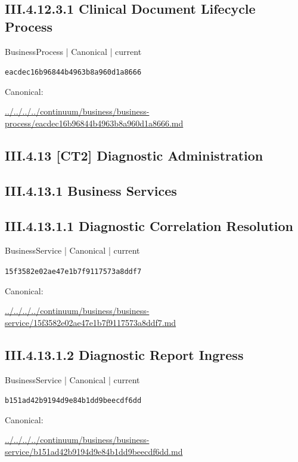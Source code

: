 \documentclass[10pt,a4paper]{article}
\begin{document}
\subsection*{III.4.12.3.1 Clinical Document Lifecycle Process}
{\small BusinessProcess | Canonical | current}\par
\texttt{eacdec16b96844b4963b8a960d1a8666}\par
Canonical: \par
{\footnotesize\url{../../../../continuum/business/business-process/eacdec16b96844b4963b8a960d1a8666.md}}\par
\subsection*{III.4.13 [CT2] Diagnostic Administration}
\subsection*{III.4.13.1 Business Services}
\subsection*{III.4.13.1.1 Diagnostic Correlation Resolution}
{\small BusinessService | Canonical | current}\par
\texttt{15f3582e02ae47e1b7f9117573a8ddf7}\par
Canonical: \par
{\footnotesize\url{../../../../continuum/business/business-service/15f3582e02ae47e1b7f9117573a8ddf7.md}}\par
\subsection*{III.4.13.1.2 Diagnostic Report Ingress}
{\small BusinessService | Canonical | current}\par
\texttt{b151ad42b9194d9e84b1dd9beecdf6dd}\par
Canonical: \par
{\footnotesize\url{../../../../continuum/business/business-service/b151ad42b9194d9e84b1dd9beecdf6dd.md}}\par
\end{document}
